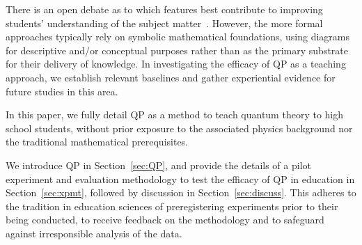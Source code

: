 There is an open debate as to which features best contribute to improving students' understanding of the subject matter~\cite{krijtenburg2017insights, greca2003does}.
However, the more formal approaches typically rely on symbolic mathematical foundations, using diagrams for descriptive and/or conceptual purposes rather than as the primary substrate for their delivery of knowledge.
In investigating the efficacy of QP as a teaching approach, we establish relevant baselines and gather experiential evidence for future studies in this area.

In this paper, we fully detail QP as a method to teach quantum theory to high school students, without prior exposure to the associated physics background nor the traditional mathematical prerequisites.

We introduce QP in Section~\ref{sec:QP}, and provide the details of a pilot experiment and evaluation methodology to test the efficacy of QP in education in Section~\ref{sec:xpmt}, followed by discussion in Section~\ref{sec:discuss}.
This adheres to the tradition in education sciences of preregistering experiments prior to their being conducted, to receive feedback on the methodology and to safeguard against irresponsible analysis of the data.

